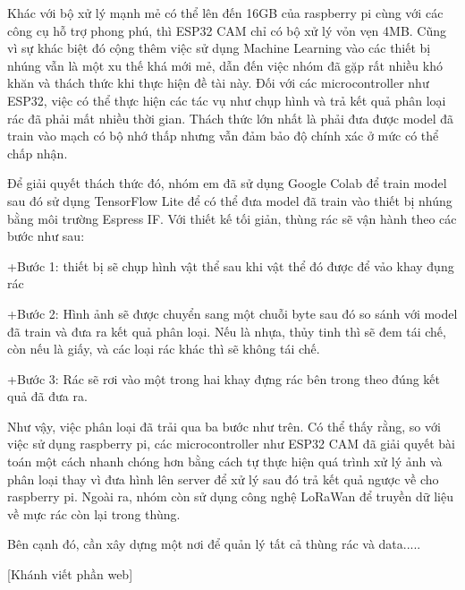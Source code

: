 Khác với bộ xử lý mạnh mẻ có thể lên đến 16GB của raspberry pi cùng với các công cụ hỗ trợ phong phú, thì ESP32 CAM chỉ có bộ xử lý vỏn vẹn 4MB.
Cũng vì sự khác biệt đó cộng thêm việc sử dụng Machine Learning vào các thiết bị nhúng vẫn là một xu thế khá mới mẻ, dẫn đến việc nhóm đã gặp rất nhiều khó khăn và thách thức khi thực hiện đề tài này.
Đối với các microcontroller như ESP32, việc có thể thực hiện các tác vụ như chụp hình và trả kết quả phân loại rác đã phải mất nhiều thời gian.
Thách thức lớn nhất là phải đưa được model đã train vào mạch có bộ nhớ thấp nhưng vẫn đảm bảo độ chính xác ở mức có thể chấp nhận. 

Để giải quyết thách thức đó, nhóm em đã sử dụng Google Colab để train model sau đó sử dụng TensorFlow Lite để có thể đưa model đã train vào thiết bị nhúng bằng môi trường Espress IF.
Với thiết kế tối giản, thùng rác sẽ vận hành theo các bước như sau: 

+Bước 1: thiết bị sẽ chụp hình vật thể sau khi vật thể đó được để vảo khay đụng rác

+Bước 2: Hình ảnh sẽ được chuyển sang một chuỗi byte sau đó so sánh với model đã train và đưa ra kết quả phân loại.
Nếu là nhựa, thủy tinh thì sẽ đem tái chế, còn nếu là giấy, và các loại rác khác thì sẽ không tái chế.

+Bước 3: Rác sẽ rơi vào một trong hai khay đựng rác bên trong theo đúng kết quả đã đưa ra.

Như vậy, việc phân loại đã trải qua ba bước như trên.
Có thể thấy rằng, so với việc sử dụng raspberry pi, các microcontroller như ESP32 CAM đã giải quyết bài toán một cách nhanh chóng hơn bằng cách tự thực hiện quá trình xử lý ảnh và phân loại thay vì đưa hình lên server để xử lý sau đó trả kết quả ngược về cho raspberry pi.
Ngoài ra, nhóm còn sử dụng công nghệ LoRaWan để truyền dữ liệu về mực rác còn lại trong thùng.


Bên cạnh đó, cần xây dựng một nơi để quản lý tất cả thùng rác và data.....

[Khánh viết phần web]










